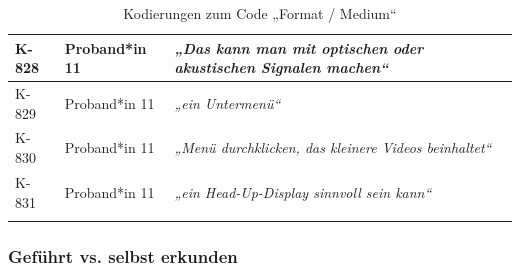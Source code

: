{\begin{xltabular}{\textwidth}{
    |P{0.10\textwidth}
    |P{0.17\textwidth}
    |Y|
}
\hline
K-828 & Proband*in 11 & \textit{„Das kann man mit optischen oder akustischen Signalen machen“} \\
\hline
K-829 & Proband*in 11 & \textit{„ein Untermenü“} \\
\hline
K-830 & Proband*in 11 & \textit{„Menü durchklicken, das kleinere Videos beinhaltet“} \\
\hline
K-831 & Proband*in 11 & \textit{„ein Head-Up-Display sinnvoll sein kann“} \\
\hline
\caption{Kodierungen zum Code „Format / Medium“}\label{tab:kodiernachweis-format-medium}\\
\end{xltabular}
}

\clearpage
\subsubsection{Geführt vs. selbst erkunden}

